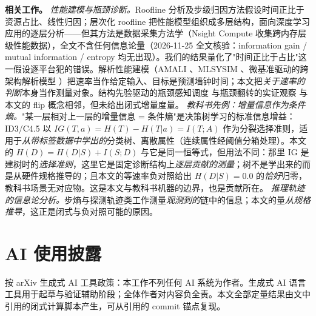 \documentclass[12pt]{ctexart}
\begin{document}
\textbf{相关工作。}
\emph{性能建模与瓶颈诊断。}Roofline 分析及步级归因方法假设时间正比于资源占比、线性归因\cite{roofline2009,amdahl2008,amdahlExt2021}；层次化 roofline 把性能模型组织成多层结构\cite{rooflineHier2020,rooflineTime2020}，面向深度学习应用的逐层分析——但其方法是数据采集方法学（Nsight Compute 收集跨内存层级性能数据），全文不含任何信息论量（2026-11-25 全文核验：information gain / mutual information / entropy 均无出现）。我们的结果量化了"时间正比于占比"这一假设逐平台犯的错误。解析性能建模（AMALI \cite{amali2025}、MLSYSIM \cite{mlsysim2026}、微基准驱动的跨架构解析模型 \cite{microbenchAnalytic2026}）把速率当作给定输入、目标是预测墙钟时间；本文把\emph{关于速率的判断}本身当作测量对象。结构先验驱动的瓶颈感知调度 \cite{saScheduler2026} 与瓶颈翻转的实证观察 \cite{memoryWallFlip2026,memoryGap2025} 与本文的 flip 概念相邻，但未给出闭式增量度量。
\emph{教科书先例：增量信息作为条件熵。}"某一层相对上一层的增量信息 = 条件熵"是决策树学习的标准信息增益：ID3/C4.5 以 $IG(T,a) = H(T) - H(T|a) = I(T;A)$ 作为分裂选择准则\cite{quinlan1986,quinlan1993}，适用于\emph{从带标签数据中学出的}分类树、离散属性（连续属性经阈值分箱处理）。本文的 $H(D) = H(D|S) + I(S;D)$ 与它是同一恒等式，但用法不同：那里 IG 是建树时的\emph{选择准则}，这里它是固定诊断结构上\emph{逐层贡献的测量}；树不是学出来的而是从硬件规格推导的；且本文的等速率负对照给出 $H(D|S) = 0.0$ 的\emph{恰好}归零，教科书场景无对应物。这是本文与教科书机器的边界，也是贡献所在。
\emph{推理轨迹的信息论分析。}步熵与探测轨迹类工作测量\emph{观测到的}链中的信息\cite{stepEntropy2025}；本文的量\emph{从规格推导}，这正是闭式与负对照可能的原因。

\section*{AI 使用披露}

按 arXiv 生成式 AI 工具政策：本工作不列任何 AI 系统为作者。生成式 AI 语言工具用于起草与验证辅助阶段；全体作者对内容负全责。本文全部定量结果由文中引用的闭式计算脚本产生，可从引用的 commit 锚点复现。



\end{document}
